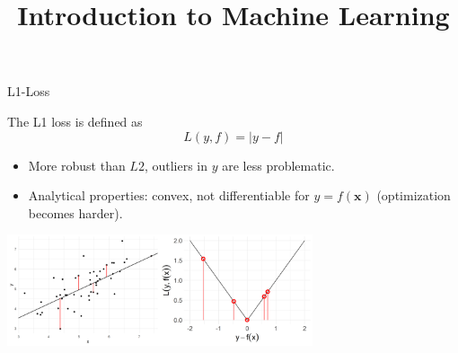 \documentclass[11pt,compress,t,notes=noshow, xcolor=table]{beamer}
\title{Introduction to Machine Learning}
\institute{\href{https://compstat-lmu.github.io/lecture_i2ml/}{compstat-lmu.github.io/lecture\_i2ml}}
\date{}
\begin{document}


\begin{vbframe}{L1-Loss}

\vspace*{-0.1cm}
The L1 loss is defined as
$$
L(y,f) = \left|y-f\right|
$$

\begin{itemize}
\setlength{\itemsep}{1.5em}
\item More robust than $L2$, outliers in $y$ are less problematic.
\item Analytical properties: convex, not differentiable for $y = f(\bm{x})$ (optimization becomes harder).
\end{itemize}

\vspace*{0.2cm}

\begin{center}  \includegraphics[width = 9cm]{figure/loss_absolute_2.png} \\
\end{center}


\end{vbframe}
\end{document}
